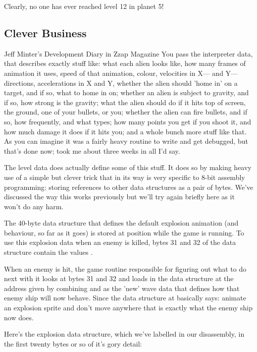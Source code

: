 Clearly, no one has ever reached level 12 in planet 5!

\subsection{Clever Business}
\begin{q}{Jeff Minter's Development Diary in Zzap Magazine\cite{planner}}
You pass the interpreter data, that describes exactly stuff like: what each
alien looks like, how many frames of animation it uses, speed of that
animation, colour, velocities in X— and Y— directions, accelerations in X and
Y, whether the alien should 'home in' on a target, and if so, what to home in
on; whether an alien is subject to gravity, and if so, how strong is the
gravity; what the alien should do if it hits top of screen, the ground, one of
your bullets, or you; whether the alien can fire bullets, and if so, how
frequently, and what types; how many points you get if you shoot it, and how
much damage it does if it hits you; and a whole bunch more stuff like that. As
you can imagine it was a fairly heavy routine to write and get debugged, but
that's done now; took me about three weeks in all I'd say.
\end{q}

The level data does actually define some of this stuff. It does so by making
heavy use of a simple but clever trick that in its way is very specific to
8-bit assembly programming: storing references to other data structures as
a pair of bytes. We've discussed the way this works previously but we'll try
again briefly here as it won't do any harm. 

The 40-byte data structure that defines the default explosion animation (and
behaviour, so far as it goes) is stored at position  while the
game is running. To use this explosion data when an enemy is killed, bytes 31
and 32 of the data structure contain the values . 

When an enemy is hit, the game routine responsible for figuring out what to do next
with it looks at bytes 31 and 32 and loads in the data structure at the address
given by combining  and  as the 'new' wave data that
defines how that enemy ship will now behave. Since the data structure at
 basically says: animate an explosion sprite and don't move
anywhere that is exactly what the enemy ship now does.

Here's the explosion data structure, which we've labelled  in
our disassembly, in the first twenty bytes or so of it's gory detail:

